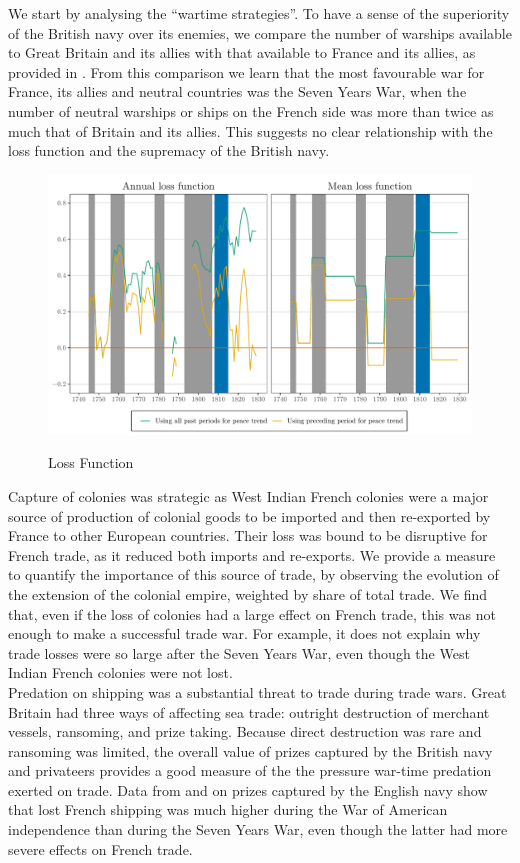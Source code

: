 \documentclass[12pt,a4paper,notitlepage,english]{article}
\begin{document}
We start by analysing the ``wartime strategies''. 
To have a sense of the superiority of the British navy over its enemies, we compare the number of warships available to Great Britain and its allies with that available to France and its allies, as provided in \citet{modelski1988seapower}.
From this comparison we learn that the most favourable war for France, its allies and neutral countries was the Seven Years War, when the number of neutral warships or ships on the French side was more than twice as much that of Britain and its allies.
This suggests no clear relationship with the loss function and the supremacy of the British navy. \\
\begin{figure}
    \centering
    \caption{Loss Function}
    \includegraphics[scale = .7]{mean_annual_loss.pdf}
    \label{fig:mean_annual_loss}
\end{figure}
Capture of colonies was strategic as West Indian French colonies were a major source of production of colonial goods to be imported and then re-exported by France to other European countries. Their loss was bound to be disruptive for French trade, as it reduced both imports and re-exports.
We provide a measure to quantify the importance of this source of trade, by observing the evolution of the extension of the colonial empire, weighted by share of total trade. We find that, even if the loss of colonies had a large effect on French trade, this was not enough to make a successful trade war. For example, it does not explain why trade losses were so large after the Seven Years War, even though the West Indian French colonies were not lost. \\
Predation on shipping was a substantial threat to trade during trade wars. Great Britain had three ways of affecting sea trade: outright destruction of merchant vessels, ransoming, and prize taking. Because direct destruction was rare and ransoming was limited, the overall value of prizes captured by the British navy and privateers provides a good measure of the the pressure war-time predation exerted on trade. Data from \citet{Benjamin2009} and \citet{Hillmann2011} on prizes captured by the English navy show that lost French shipping was much higher during the War of American independence than during the Seven Years War, even though the latter had more severe effects on French trade.\\
\end{document}
